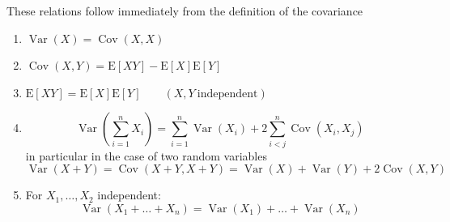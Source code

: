 \documentclass[11pt]{article}
\newcommand*\ev[1]{\mathrel{\text{E}\left[#1\right]}}
\newcommand*\Cov[1]{\mathop{\text{Cov}}\left(#1\right)}
\newcommand*\Var[1]{\mathop{\text{Var}}\left(#1\right)}
\begin{document}
\vspace{1em}
\noindent
These relations follow immediately from the definition of the covariance
\begin{enumerate}
	\item $\Var{X} = \Cov{X,X}$
	\item $\Cov{X,Y} = \ev{XY} - \ev{X}\ev{Y}$
	\item $\ev{XY} = \ev{X}\ev{Y}\qquad (X,Y\ \text{independent})$
	\item
	\begin{equation*}
		\Var{\sum_{i=1}^{n}X_i} = \sum_{i=1}^{n}\Var{X_i} + 2\sum_{i<j}^{n}\Cov{X_i,X_j}
	\end{equation*}
	in particular in the case of two random variables
	\begin{equation*}
		\Var{X + Y} = \Cov{X + Y, X + Y} = \Var{X} + \Var{Y} + 2\Cov{X,Y}
	\end{equation*}
	\item For $X_1,\dots,X_2$ independent:
	\begin{equation*}
		\Var{X_1+\dots+X_n} = \Var{X_1} + \dots + \Var{X_n}
	\end{equation*}
\end{enumerate}
\end{document}
